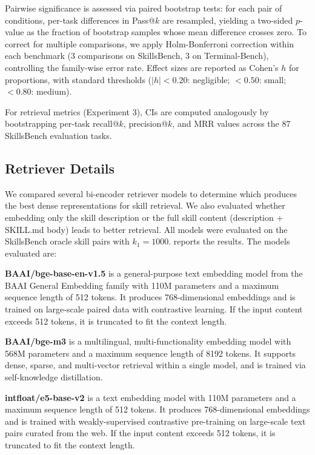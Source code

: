 \documentclass[11pt]{article}
\begin{document}
Pairwise significance is assessed via paired bootstrap tests: for each pair of conditions, per-task differences in Pass@$k$ are resampled, yielding a two-sided $p$-value as the fraction of bootstrap samples whose mean difference crosses zero.
To correct for multiple comparisons, we apply Holm-Bonferroni correction within each benchmark (3 comparisons on SkillsBench, 3 on Terminal-Bench), controlling the family-wise error rate.
Effect sizes are reported as Cohen's $h$ for proportions, with standard thresholds ($|h| < 0.20$: negligible; $< 0.50$: small; $< 0.80$: medium).

For retrieval metrics (Experiment 3), CIs are computed analogously by bootstrapping per-task recall@$k$, precision@$k$, and MRR values across the 87 SkillsBench evaluation tasks.

\subsection{Retriever Details}
\label{sec:retriever_details}

We compared several bi-encoder retriever models to determine which produces the best dense representations for skill retrieval.
We also evaluated whether embedding only the skill description or the full skill content (description + SKILL.md body) leads to better retrieval.
All models were evaluated on the SkillsBench oracle skill pairs with $k_1 = 1000$.
 reports the results.
The models evaluated are:

\textbf{BAAI/bge-base-en-v1.5} \citep{xiao2024c} is a general-purpose text embedding model from the BAAI General Embedding family with 110M parameters and a maximum sequence length of 512 tokens.
It produces 768-dimensional embeddings and is trained on large-scale paired data with contrastive learning.
If the input content exceeds 512 tokens, it is truncated to fit the context length.

\textbf{BAAI/bge-m3} \citep{chen2024m3} is a multilingual, multi-functionality embedding model with 568M parameters and a maximum sequence length of 8192 tokens.
It supports dense, sparse, and multi-vector retrieval within a single model, and is trained via self-knowledge distillation.

\textbf{intfloat/e5-base-v2} \citep{wang2022text} is a text embedding model with 110M parameters and a maximum sequence length of 512 tokens.
It produces 768-dimensional embeddings and is trained with weakly-supervised contrastive pre-training on large-scale text pairs curated from the web.
If the input content exceeds 512 tokens, it is truncated to fit the context length.
\end{document}
